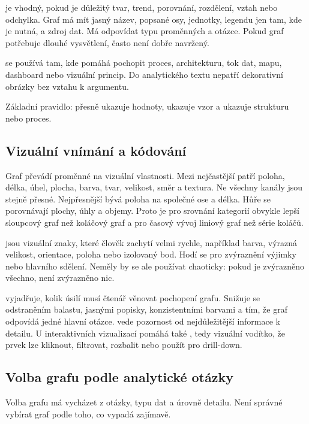  je vhodný, pokud je důležitý tvar, trend, porovnání, rozdělení, vztah nebo odchylka. Graf
má mít jasný název, popsané osy, jednotky, legendu jen tam, kde je nutná, a zdroj dat. Má odpovídat
typu proměnných a otázce. Pokud graf potřebuje dlouhé vysvětlení, často není dobře navržený.

 se používá tam, kde pomáhá pochopit proces, architekturu, tok dat,
mapu, dashboard nebo vizuální princip. Do analytického textu nepatří dekorativní obrázky bez vztahu
k argumentu.

Základní pravidlo:  přesně ukazuje hodnoty,  ukazuje vzor a 
ukazuje strukturu nebo proces.

\subsection{Vizuální vnímání a kódování}
Graf převádí proměnné na vizuální vlastnosti. Mezi nejčastější  patří poloha,
délka, úhel, plocha, barva, tvar, velikost, směr a textura. Ne všechny kanály jsou stejně přesné.
Nejpřesnější bývá poloha na společné ose a délka. Hůře se porovnávají plochy, úhly a objemy.
Proto je pro srovnání kategorií obvykle lepší sloupcový graf než koláčový graf a pro časový vývoj
liniový graf než série koláčů.

 jsou vizuální znaky, které člověk zachytí velmi rychle, například
barva, výrazná velikost, orientace, poloha nebo izolovaný bod. Hodí se pro zvýraznění výjimky nebo
hlavního sdělení. Neměly by se ale používat chaoticky: pokud je zvýrazněno všechno, není zvýrazněno
nic.

 vyjadřuje, kolik úsilí musí čtenář věnovat pochopení grafu. Snižuje se
odstraněním balastu, jasnými popisky, konzistentními barvami a tím, že graf odpovídá jedné hlavní
otázce.  vede pozornost od nejdůležitější informace k detailu. U
interaktivních vizualizací pomáhá také , tedy vizuální vodítko, že prvek lze kliknout,
filtrovat, rozbalit nebo použít pro drill-down.

\subsection{Volba grafu podle analytické otázky}
Volba grafu má vycházet z otázky, typu dat a úrovně detailu. Není správné vybírat graf podle toho,
co vypadá zajímavě.

